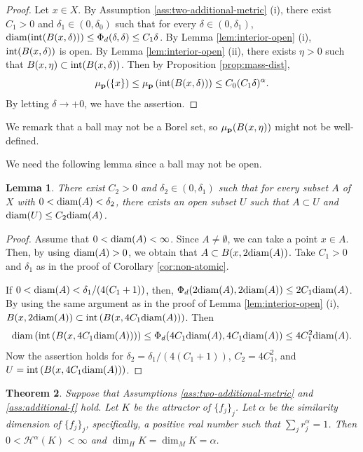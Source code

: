 \documentclass[a4paper, reqno, 11pt]{amsart}
\newtheorem{Thm}{Theorem}[section]
\newtheorem{Lem}[Thm]{Lemma}
\theoremstyle{definition}
\begin{document}
\begin{proof}
Let $x \in X$. 
By Assumption \ref{ass:two-additional-metric} (i), 
there exist $C_1 > 0$ and $\delta_1 \in (0, \delta_0)$ such that for every $\delta \in (0, \delta_1)$, 
$\textup{diam}(\textup{int}(B(x,\delta))) \le \Phi_d (\delta, \delta) \le C_1 \delta$. 
By Lemma \ref{lem:interior-open} (i), $\textup{int}(B(x,\delta))$ is open.
By Lemma \ref{lem:interior-open} (ii), there exists $\eta > 0$ such that $B(x,\eta) \subset \textup{int}(B(x,\delta))$. 
Then by Proposition \ref{prop:mass-dist}, 
\[ \mu_{\bf p}(\{x\}) \le \mu_{\bf p} \left( \textup{int}(B(x,\delta)) \right) \le C_0 (C_1 \delta)^{\alpha}.   \]
By letting $\delta \to +0$, we have the assertion. 
\end{proof}

We remark that a ball may not be a Borel set, so $\mu_{\bf p}(B(x,\eta))$ might not be well-defined. 

We need the following lemma since a ball may not be open. 

\begin{Lem}\label{lem:large-open}
There exist $C_2 > 0$ and $\delta_2 \in (0, \delta_1)$  such that for every subset $A$ of $X$ with $0 < \textup{diam}(A) < \delta_2$, 
there exists an open subset $U$ such that $A \subset U$ and $ \textup{diam}(U) \le C_2 \textup{diam}(A)$. 
\end{Lem}

\begin{proof}
Assume that $0 < \textup{diam}(A) < \infty$. 
Since $A \ne \emptyset$, we can take a point $x \in A$. 
Then, by using $\textup{diam}(A) > 0$, we obtain that $A \subset B(x, 2\textup{diam}(A))$. 
Take $C_1 > 0$ and $\delta_1$ as in the proof of Corollary \ref{cor:non-atomic}. 

If $0 < \textup{diam}(A) < \delta_1 / (4(C_1 + 1))$, then, $\Phi_d (2\textup{diam}(A), 2\textup{diam}(A)) \le 2C_1 \textup{diam}(A)$. 
By using the same argument as in the proof of Lemma \ref{lem:interior-open} (i), 
$B(x, 2\textup{diam}(A)) \subset \textup{int} \left(B(x, 4C_1 \textup{diam}(A)) \right)$. 
Then 
\[ \textup{diam}\left(  \textup{int} \left(B(x, 4C_1 \textup{diam}(A)) \right) \right) \le \Phi_d (4C_1 \textup{diam}(A),  4C_1 \textup{diam}(A)) \le 4C_1^2 \textup{diam}(A). \]
Now the assertion holds for $\delta_2 =  \delta_1 / (4(C_1 + 1))$, $C_2 = 4C_1^2$, and $U =  \textup{int} \left(B(x, 4C_1 \textup{diam}(A)) \right)$. 
\end{proof}


\begin{Thm}\label{thm:main}
Suppose that  Assumptions \ref{ass:two-additional-metric} and \ref{ass:additional-f}  hold. 
Let $K$ be the attractor of $\{f_j\}_j$. 
Let $\alpha$ be the similarity dimension of $\{f_j\}_j$, specifically,  a positive real number such that $\sum_j r_j^{\alpha} = 1$. 
Then $0 < \mathcal{H}^{\alpha}(K) < \infty$ and $\dim_H K = \dim_M K = \alpha$. 
\end{Thm}
\end{document}
